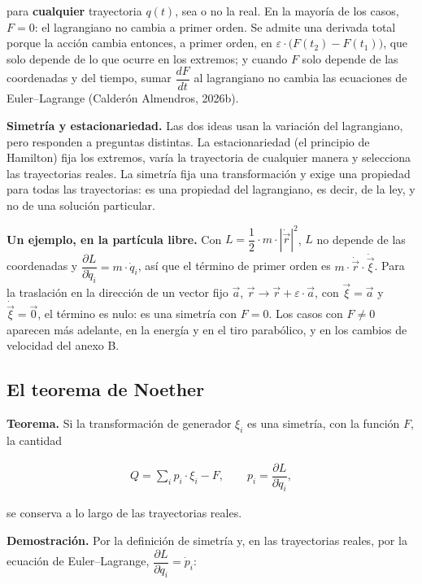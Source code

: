 \documentclass[11pt,a4paper,spanish]{book}
\begin{document}
para \textbf{cualquier} trayectoria \(q(t)\), sea o no la real. En la
mayoría de los casos, \(F = 0\): el lagrangiano no cambia a primer
orden. Se admite una derivada total porque la acción cambia entonces, a
primer orden, en \(\varepsilon \cdot \big(F(t_2) - F(t_1)\big)\), que
solo depende de lo que ocurre en los extremos; y cuando \(F\) solo
depende de las coordenadas y del tiempo, sumar \(\dfrac{dF}{dt}\) al
lagrangiano no cambia las ecuaciones de Euler--Lagrange (Calderón
Almendros, 2026b).

\textbf{Simetría y estacionariedad.} Las dos ideas usan la variación del
lagrangiano, pero responden a preguntas distintas. La estacionariedad
(el principio de Hamilton) fija los extremos, varía la trayectoria de
cualquier manera y selecciona las trayectorias reales. La simetría fija
una transformación y exige una propiedad para todas las trayectorias: es
una propiedad del lagrangiano, es decir, de la ley, y no de una solución
particular.

\textbf{Un ejemplo, en la partícula libre.} Con
\(L = \dfrac{1}{2} \cdot m \cdot |\dot{\vec{r}}|^2\), \(L\) no depende
de las coordenadas y
\(\dfrac{\partial L}{\partial \dot{q}_i} = m \cdot \dot{q}_i\), así que
el término de primer orden es
\(m \cdot \dot{\vec{r}} \cdot \dot{\vec{\xi}}\). Para la traslación en
la dirección de un vector fijo \(\vec{a}\),
\(\vec{r} \to \vec{r} + \varepsilon \cdot \vec{a}\), con
\(\vec{\xi} = \vec{a}\) y \(\dot{\vec{\xi}} = \vec{0}\), el término es
nulo: es una simetría con \(F = 0\). Los casos con \(F \neq 0\) aparecen
más adelante, en la energía y en el tiro parabólico, y en los cambios de
velocidad del anexo B.

\subsection{El teorema de Noether}\label{el-teorema-de-noether}

\textbf{Teorema.} Si la transformación de generador \(\xi_i\) es una
simetría, con la función \(F\), la cantidad

\[
\begin{aligned}
Q = \sum_i p_i \cdot \xi_i - F, \qquad p_i = \dfrac{\partial L}{\partial \dot{q}_i},
\end{aligned}
\]

se conserva a lo largo de las trayectorias reales.

\textbf{Demostración.} Por la definición de simetría y, en las
trayectorias reales, por la ecuación de Euler--Lagrange,
\(\dfrac{\partial L}{\partial q_i} = \dot{p}_i\):
\end{document}
